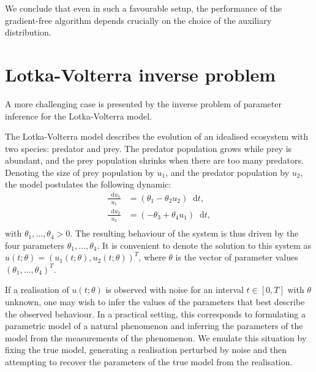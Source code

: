 \documentclass[11pt,a4paper]{report}
\newcommand*\diff{\mathop{}\!\mathrm{d}}
\begin{document}
We conclude that even in such a favourable setup, the performance of the gradient-free algorithm depends crucially on the choice of the auxiliary distribution.

\section{Lotka-Volterra inverse problem}
\label{sec:lotka-volterra}

A more challenging case is presented by the inverse problem of parameter inference for the Lotka-Volterra model.


The Lotka-Volterra model describes the evolution of an idealised ecosystem with two species: predator and prey. The predator population grows while prey is abundant, and the prey population shrinks when there are too many predators. Denoting the size of prey population by $u_1$, and the predator population by $u_2$, the model postulates the following dynamic:
\begin{equation}
\begin{aligned}
\frac{\diff u_1}{u_1} & = ( \theta_1 - \theta_2 u_2 ) \diff t, \\
\frac{\diff u_2}{u_2} & = ( -\theta_3 + \theta_4 u_1 ) \diff t, \\
\end{aligned}
\label{eq:lotka-volterra}
\end{equation}
with $\theta_1, \dots, \theta_4 > 0$. The resulting behaviour of the system is thus driven by the four parameters $\theta_1, \dots, \theta_4$. It is convenient to denote the solution to this system as  $u(t;\theta) = (u_1(t; \theta), u_2(t; \theta))^T$, where $\theta$ is the vector of parameter values $(\theta_1, \dots, \theta_4)^T$.

If a realisation of $u(t; \theta)$ is observed with noise for an interval $t \in [0, T]$ with $\theta$ unknown, one may wish to infer the values of the parameters that best describe the observed behaviour. In a practical setting, this corresponds to formulating a parametric model of a natural phenomenon and inferring the parameters of the model from the measurements of the phenomenon. We emulate this situation by fixing the true model, generating a realisation perturbed by noise and then attempting to recover the parameters of the true model from the realisation.
\end{document}
